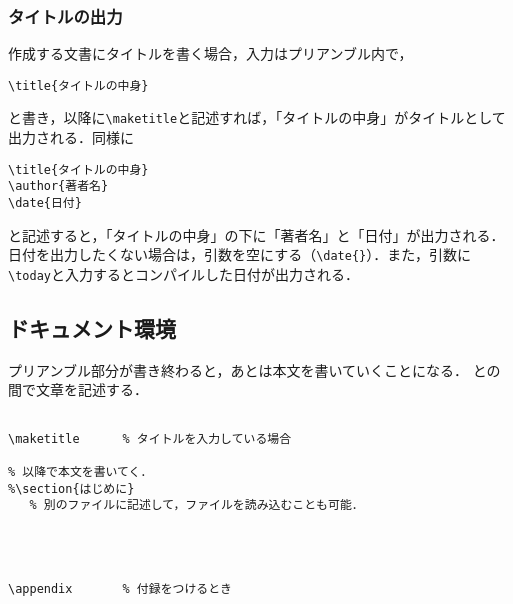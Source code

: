 \subsubsection{タイトルの出力}

作成する文書にタイトルを書く場合，入力はプリアンブル内で，
\begin{tcolorbox}[colback=blue!5!white,colframe=blue!70!black]
\begin{lstlisting}
\title{タイトルの中身}
\end{lstlisting}
\end{tcolorbox}
\noindent
と書き，\verb||以降に\verb|\maketitle|と記述すれば，「タイトルの中身」がタイトルとして出力される．同様に

\begin{tcolorbox}[colback=blue!5!white,colframe=blue!70!black,breakable=true]
\begin{lstlisting}
\title{タイトルの中身}
\author{著者名}
\date{日付}
\end{lstlisting}
\end{tcolorbox}
\noindent 
と記述すると，「タイトルの中身」の下に「著者名」と「日付」が出力される．日付を出力したくない場合は，引数を空にする（\verb|\date{}|）．また，引数に\verb|\today|と入力するとコンパイルした日付が出力される．


\subsection{ドキュメント環境}

プリアンブル部分が書き終わると，あとは本文を書いていくことになる．
\verb||と\verb||の間で文章を記述する．
\begin{tcolorbox}[colback=blue!5!white,colframe=blue!70!black,breakable=true]
\begin{lstlisting}

\maketitle      % タイトルを入力している場合

% 以降で本文を書いてく．
%\section{はじめに}
   % 別のファイルに記述して，ファイルを読み込むことも可能．




\appendix       % 付録をつけるとき


\end{lstlisting}
\end{tcolorbox}

